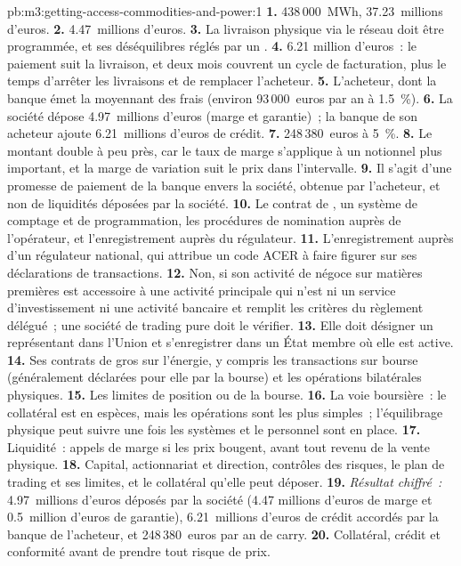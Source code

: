 \begin{solution}{pb:m3:getting-access-commodities-and-power:1}
\textbf{1.} 438\,000~MWh, 37.23~millions d'euros. \textbf{2.} 4.47~millions d'euros. \textbf{3.} La livraison physique
via le réseau doit être programmée, et ses déséquilibres réglés par un . \textbf{4.} 6.21
million d'euros~: le paiement suit la livraison, et deux mois couvrent un cycle de facturation, plus le temps d'arrêter les livraisons et
de remplacer l'acheteur. \textbf{5.} L'acheteur, dont la banque émet la  moyennant des frais (environ 93\,000~euros par an à 1.5~\%).
\textbf{6.} La société dépose 4.97~millions d'euros (marge et garantie)~; la banque de son acheteur ajoute 6.21~millions d'euros de
crédit. \textbf{7.} 248\,380~euros à 5~\%. \textbf{8.} Le montant double à peu près, car le taux de marge s'applique à un
notionnel plus important, et la marge de variation suit le prix dans l'intervalle. \textbf{9.} Il s'agit d'une promesse
de paiement de la banque envers la société, obtenue par l'acheteur, et non de liquidités déposées par la société. \textbf{10.} Le contrat de , un
système de comptage et de programmation, les procédures de nomination auprès de l'opérateur, et l'enregistrement auprès du régulateur.
\textbf{11.} L'enregistrement auprès d'un régulateur national, qui attribue un code ACER à faire figurer sur ses déclarations de transactions.
\textbf{12.} Non, si son activité de négoce sur matières premières est accessoire à une activité principale qui n'est ni un service d'investissement
ni une activité bancaire et remplit les critères du règlement délégué~; une société de trading pure doit le vérifier. \textbf{13.} Elle doit
désigner un représentant dans l'Union et s'enregistrer dans un État membre où elle est active. \textbf{14.} Ses
contrats de gros sur l'énergie, y compris les transactions sur bourse (généralement déclarées pour elle par la bourse) et les
opérations bilatérales physiques. \textbf{15.} Les limites de position ou  de la bourse. \textbf{16.} La
voie boursière~: le collatéral est en espèces, mais les opérations sont les plus simples~; l'équilibrage physique peut suivre une fois les systèmes
et le personnel sont en place. \textbf{17.} Liquidité~: appels de marge si les prix bougent, avant tout revenu de la
vente physique. \textbf{18.} Capital, actionnariat et direction, contrôles des risques, le plan de trading et ses limites,
et le collatéral qu'elle peut déposer. \textbf{19.} \emph{Résultat chiffré~:} 4.97~millions d'euros déposés par la société (4.47
millions d'euros de marge et 0.5~million d'euros de garantie), 6.21~millions d'euros de crédit accordés par la banque de l'acheteur, et
248\,380~euros par an de carry. \textbf{20.} Collatéral, crédit et conformité avant de prendre tout risque de prix.
\end{solution}


